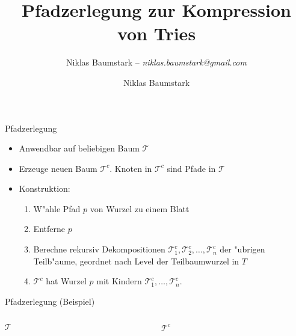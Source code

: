 \documentclass[ngerman,hyperref={pdfpagelabels=true}]{beamer}
\title{Pfadzerlegung zur Kompression von Tries}
\subtitle{Niklas Baumstark -- \textit{niklas.baumstark@gmail.com}}
\author{Niklas Baumstark}
\institute{ITI-Sanders}
\begin{document}


\setlength\textheight{7cm} %

\begin{frame}
  \maketitle
\end{frame}


\newcommand\T{\mathcal{T}}

\begin{frame}{Pfadzerlegung}
\begin{itemize}
\item Anwendbar auf beliebigen Baum $\T$
\item Erzeuge neuen Baum $\T^c$. Knoten in $\T^c$ sind Pfade in $\T$
\item Konstruktion:
\begin{enumerate}
\item W"ahle Pfad $p$ von Wurzel zu einem Blatt
\item Entferne $p$
\item Berechne rekursiv Dekompositionen $\T^c_1, \T^c_2, \ldots, \T^c_n$ der "ubrigen Teilb"aume,
geordnet nach Level der Teilbaumwurzel in $T$
\item $\T^c$ hat Wurzel $p$ mit Kindern $\T^c_1, \ldots, \T^c_n$.
\end{enumerate}
\end{itemize}
\end{frame}

\begin{frame}{Pfadzerlegung (Beispiel)}

\begin{columns}[T] %
\begin{column}{.48\textwidth}

\centering
$\T$\\[1em]


\end{column}%
\hfill%
\begin{column}{.48\textwidth}

\centering
$\T^c$\\[1em]


\end{column}%
\end{columns}

\end{frame}
\end{document}
